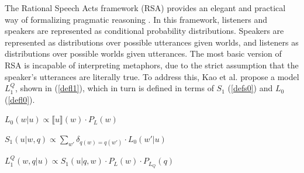 \documentclass[9pt,twocolumn,twoside,lineno]{pnas-new}
\newcommand{\Listener}{L}
\newcommand{\QLONE}{\Listener_{{1}}^{{Q}}}
\begin{document}
	The Rational Speech Acts framework (RSA) provides an elegant and practical way of formalizing pragmatic reasoning \cite{frank2012predicting}.
	In this framework, listeners and speakers are represented as conditional probability distributions. Speakers are represented as distributions over possible utterances given worlds, and listeners as distributions over possible worlds given utterances.
	The most basic version of RSA \cite{frank2012predicting} is incapable of interpreting metaphors, due to the strict assumption that the speaker's utterances are literally true. To address this, Kao et al. \cite{kao} propose a model $\QLONE$, shown in (\ref{defl1}), which in turn is defined in terms of $S_1$ (\ref{defs0}) and $L_0$ (\ref{defl0}).








	\begin{examples}
	\item $L_0(w\vert u) \propto \llbracket u \rrbracket (w)\cdot P_L(w)$ \label{defl0}
	\item $S_1(u\vert w,q) \propto \sum_{w'} \delta_{q(w)=q(w')} \cdot L_0(w'\vert u)$ \label{defs0}
	\item $\QLONE(w,q\vert u) \propto S_1(u\vert q,w)\cdot P_L(w)\cdot P_{L_Q}(q)$ \label{defl1}
	\end{examples}
\end{document}
